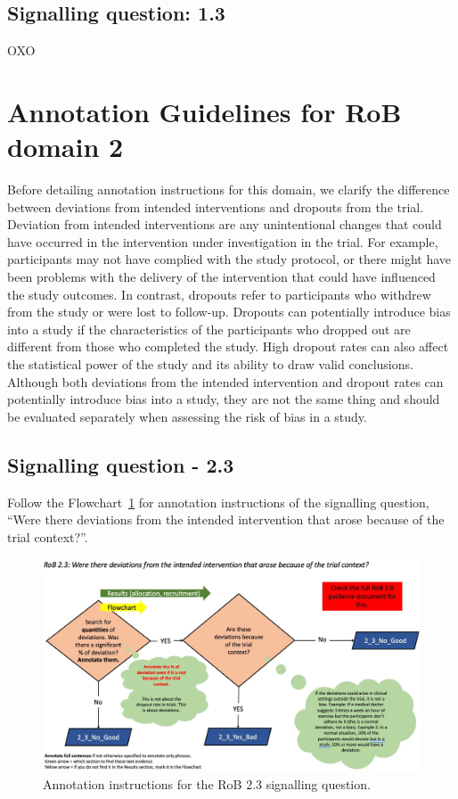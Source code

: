 \documentclass[sn-mathphys,Numbered]{sn-jnl}%
\begin{document}
\subsection*{Signalling question: 1.3}
%
OXO
%
%
%
\section*{Annotation Guidelines for RoB domain 2}
\label{sec:dom2}
%
Before detailing annotation instructions for this domain, we clarify the difference between deviations from intended interventions and dropouts from the trial.
Deviation from intended interventions are any unintentional changes that could have occurred in the intervention under investigation in the trial.
For example, participants may not have complied with the study protocol, or there might have been problems with the delivery of the intervention that could have influenced the study outcomes.
In contrast, dropouts refer to participants who withdrew from the study or were lost to follow-up.
Dropouts can potentially introduce bias into a study if the characteristics of the participants who dropped out are different from those who completed the study.
High dropout rates can also affect the statistical power of the study and its ability to draw valid conclusions.
Although both deviations from the intended intervention and dropout rates can potentially introduce bias into a study, they are not the same thing and should be evaluated separately when assessing the risk of bias in a study.
%
%
%
\subsection*{Signalling question - 2.3}
\label{subsec:2_3}
%
Follow the Flowchart~\ref{fig:2_3} for annotation instructions of the signalling question, ``Were there deviations from the intended intervention that arose because of the trial context?''.
%
\begin{figure}[hbt]
    \centering
    \includegraphics[width=\textwidth]{figures/2_3.jpg}
    \caption{Annotation instructions for the RoB 2.3 signalling question.}
    \label{fig:2_3}
\end{figure}
%
\end{document}
